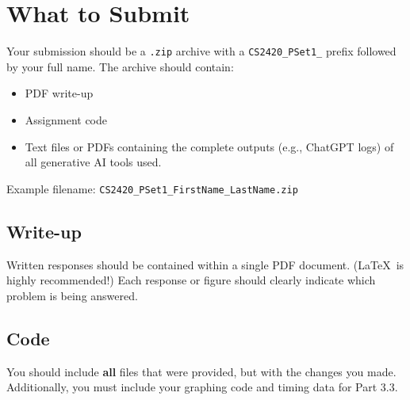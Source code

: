 \documentclass[a4 paper]{article}
\begin{document}
\newpage
\section{What to Submit}
\label{sec:submission}
Your submission should be a \texttt{.zip} archive with a \texttt{CS2420\_PSet1\_} prefix followed by your full name.
The archive should contain:
\begin{itemize}
    \item PDF write-up
    \item Assignment code
    \item Text files or PDFs containing the complete outputs (e.g., ChatGPT logs) of all generative AI tools used.
\end{itemize}



\noindent
Example filename: \texttt{CS2420\_PSet1\_FirstName\_LastName.zip}\\

\subsection*{Write-up}
Written responses should be contained within a single PDF document.
(\LaTeX~is highly recommended!)
Each response or figure should clearly indicate which problem is being answered.

\subsection*{Code}
You should include \textbf{all} files that were provided, but with the changes you made.
Additionally, you must include your graphing code and timing data for Part 3.3.
\end{document}
